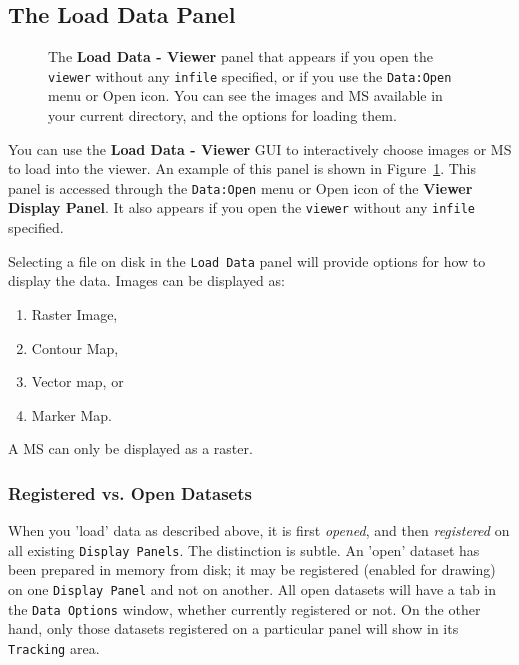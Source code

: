 
\subsection{The Load Data Panel}
\label{section:display.viewerGUI.load}

\begin{figure}[h!]
\begin{center}
\caption{\label{fig:viewer_load} The {\bf Load Data - Viewer} panel
that appears if you open the {\tt viewer} without any {\tt infile}
specified, or if you use the {\tt Data:Open} menu or Open icon.
You can see the images and MS available in your current directory,
and the options for loading them.} 
\hrulefill
\end{center}
\end{figure}

You can use the {\bf Load Data - Viewer} GUI to interactively
choose images or MS to load into the viewer.  An example of
this panel is shown in Figure~\ref{fig:viewer_load}.  This
panel is accessed through the {\tt Data:Open} menu or Open icon
of the {\bf Viewer Display Panel}.  It also appears if you open 
the {\tt viewer} without any {\tt infile} specified.

Selecting a file on disk in the {\tt Load Data} panel will
provide options for how to display the data. Images can be displayed
as: 
\begin{enumerate}
\item Raster Image, 
\item Contour Map, 
\item Vector map, or 
\item Marker Map.  
\end{enumerate}
A MS can only be displayed as a raster.


\subsubsection{Registered vs. Open Datasets}
\label{section:display.viewerGUI.load.register}

When you 'load' data as described above, it is first {\em opened}, and then
{\em registered} on all existing {\tt Display Panels}.  The distinction
is subtle.  An 'open' dataset has been prepared in memory from disk; it
may be registered (enabled for drawing) on one {\tt Display Panel} and not
on another.  All open datasets will have a tab in the {\tt Data Options}
window, whether currently registered or not.  On the other hand, only those
datasets registered on a particular panel will show in its {\tt Tracking}
area.

